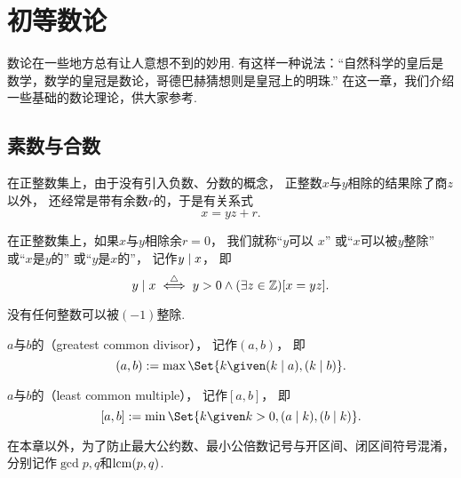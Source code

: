 \begingroup
\chapter{初等数论}
数论在一些地方总有让人意想不到的妙用.
有这样一种说法：“自然科学的皇后是数学，数学的皇冠是数论，哥德巴赫猜想则是皇冠上的明珠.”
在这一章，我们介绍一些基础的数论理论，供大家参考.

\section{素数与合数}
在正整数集上，由于没有引入负数、分数的概念，
正整数\(x\)与\(y\)相除的结果除了商\(z\)以外，
还经常是带有余数\(r\)的，于是有关系式\begin{equation*}
	x = y z + r.
\end{equation*}

\begin{definition}
在正整数集上，如果\(x\)与\(y\)相除余\(r=0\)，
我们就称“\(y\)可以 \(x\)”
或“\(x\)可以被\(y\)整除”
或“\(x\)是\(y\)的”
或“\(y\)是\(x\)的”，
记作\(\truediv{x}{y}\)，
即\begin{equation*}
	\truediv{x}{y}
	\defiff
	y > 0
	\land
	(\exists z\in\mathbb{Z})
	[x = y z].
\end{equation*}
\end{definition}

\begin{property}
没有任何整数可以被\((-1)\)整除.
\end{property}

\begin{definition}
\(a\)与\(b\)的（greatest common divisor），
记作\((a,b)\)，
即\begin{equation*}
	(a,b) \defeq \max\Set{ k \given (\truediv{a}{k}), (\truediv{b}{k}) }.
\end{equation*}
\end{definition}
\begin{definition}
\(a\)与\(b\)的（least common multiple），
记作\([a,b]\)，
即\begin{equation*}
	[a,b] \defeq \min\Set{ k \given k>0, (\truediv{k}{a}), (\truediv{k}{b}) }.
\end{equation*}
\end{definition}
在本章以外，为了防止最大公约数、最小公倍数记号与开区间、闭区间符号混淆，
分别记作\(\gcd{p,q}\)和\(\lcm{p,q}\).

